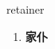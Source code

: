 
\begin{frame}
{\huge retainer}
\begin{center}
\begin{enumerate}\Large
  \item \textbf{家仆}
\end{enumerate}
\end{center}
\end{frame}
